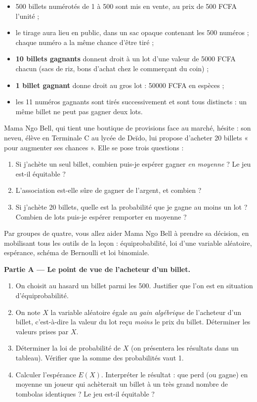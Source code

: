\documentclass[11pt]{article}
\newcommand{\cle}[1]{{\popxbold\color{popdark}#1}}
\newcounter{popsec}
\newcounter{popsub}
\newcommand{\courssub}[1]{%
  \stepcounter{popsub}%
  \par\vspace{9pt}\noindent{\popxbold\fontsize{11.5}{13}\selectfont\color{popink}{\color{poporange}\thepopsec.\thepopsub}\hspace{6pt}#1}\par\nopagebreak\vspace{4pt}
}
\begin{document}
\begin{itemize}
\item \num{500} billets numérotés de 1 à 500 sont mis en vente, au prix de \num{500} FCFA l'unité ;
\item le tirage aura lieu en public, dans un sac opaque contenant les \num{500} numéros ; chaque numéro a la même chance d'être tiré ;
\item \textbf{10 billets gagnants} donnent droit à un lot d'une valeur de \num{5000} FCFA chacun (sacs de riz, bons d'achat chez le commerçant du coin) ;
\item \textbf{1 billet gagnant} donne droit au gros lot : \num{50000} FCFA en espèces ;
\item les 11 numéros gagnants sont tirés successivement et sont tous distincts : un même billet ne peut pas gagner deux lots.
\end{itemize}

Mama Ngo Bell, qui tient une boutique de provisions face au marché, hésite : son neveu, élève en Terminale C au lycée de Deïdo, lui propose d'acheter 20 billets « pour augmenter ses chances ». Elle se pose trois questions :

\begin{enumerate}
\item Si j'achète un seul billet, combien puis-je espérer gagner \emph{en moyenne} ? Le jeu est-il équitable ?
\item L'association est-elle sûre de gagner de l'argent, et combien ?
\item Si j'achète 20 billets, quelle est la probabilité que je gagne au moins un lot ? Combien de lots puis-je espérer remporter en moyenne ?
\end{enumerate}

Par groupes de quatre, vous allez aider Mama Ngo Bell à prendre sa décision, en mobilisant tous les outils de la leçon : équiprobabilité, loi d'une variable aléatoire, espérance, schéma de Bernoulli et loi binomiale.

\courssub{Consignes}

\textbf{Partie A — Le point de vue de l'acheteur d'un billet.}

\begin{enumerate}
\item On choisit au hasard un billet parmi les 500. Justifier que l'on est en situation d'\cle{équiprobabilité}.
\item On note $X$ la variable aléatoire égale au \emph{gain algébrique} de l'acheteur d'un billet, c'est-à-dire la valeur du lot reçu \emph{moins} le prix du billet. Déterminer les valeurs prises par $X$.
\item Déterminer la loi de probabilité de $X$ (on présentera les résultats dans un tableau). Vérifier que la somme des probabilités vaut 1.
\item Calculer l'espérance $E(X)$. Interpréter le résultat : que perd (ou gagne) en moyenne un joueur qui achèterait un billet à un très grand nombre de tombolas identiques ? Le jeu est-il équitable ?
\end{enumerate}
\end{document}
